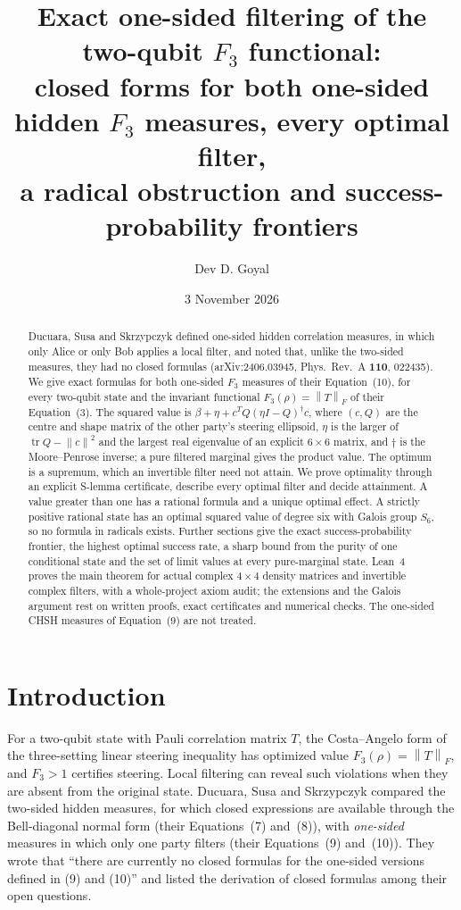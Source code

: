 \documentclass[11pt]{article}
\title{Exact one-sided filtering of the two-qubit $F_3$ functional:\\
\large closed forms for both one-sided hidden $F_3$ measures, every optimal filter,\\
a radical obstruction and success-probability frontiers}
\author{Dev D. Goyal}
\date{3 November 2026}
\theoremstyle{remark}\newtheorem{remark}[theorem]{Remark}
\newcommand{\tr}{\operatorname{tr}}
\newcommand{\norm}[1]{\left\lVert#1\right\rVert}
\begin{document}
\maketitle
\begin{abstract}
Ducuara, Susa and Skrzypczyk defined one-sided hidden correlation measures,
in which only Alice or only Bob applies a local filter, and noted that, unlike
the two-sided measures, they had no closed formulas
(arXiv:2406.03945, Phys.\ Rev.\ A \textbf{110}, 022435). We give exact
formulas for both one-sided $F_3$ measures of their Equation~(10), for every
two-qubit state and the invariant functional $F_3(\rho)=\norm{T}_F$ of their
Equation~(3). The squared value is $\beta+\eta+c^TQ(\eta I-Q)^\dagger c$,
where $(c,Q)$ are the centre and shape matrix of the other party's steering
ellipsoid, $\eta$ is the larger of $\tr Q-\norm c^2$ and the largest real
eigenvalue of an explicit $6\times6$ matrix, and $\dagger$ is the
Moore--Penrose inverse; a pure filtered marginal gives the product value.
The optimum is a supremum, which an invertible filter need not attain. We
prove optimality through an explicit S-lemma certificate, describe every
optimal filter and decide attainment. A value greater than one has a rational
formula and a unique optimal effect. A strictly positive rational state has
an optimal squared value of degree six with Galois group $S_6$, so no formula
in radicals exists. Further sections give the exact success-probability
frontier, the highest optimal success rate, a sharp bound from the purity of
one conditional state and the set of limit values at every pure-marginal
state. Lean~4 proves the main theorem for actual complex $4\times4$ density
matrices and invertible complex filters, with a whole-project axiom audit;
the extensions and the Galois argument rest on written proofs, exact
certificates and numerical checks. The one-sided CHSH measures of
Equation~(9) are not treated.
\end{abstract}

\tableofcontents
\clearpage

\section{Introduction}

For a two-qubit state with Pauli correlation matrix $T$, the Costa--Angelo
form of the three-setting linear steering inequality \cite{costa,cjwr} has
optimized value $F_3(\rho)=\norm{T}_F$, and $F_3>1$ certifies steering.
Local filtering can reveal such violations when they are absent from the
original state. Ducuara, Susa and Skrzypczyk \cite{ducuara} compared the
two-sided hidden measures, for which closed expressions are available
through the Bell-diagonal normal form (their Equations~(7) and~(8)), with
\emph{one-sided} measures in which only one party filters
(their Equations~(9) and~(10)). They wrote that ``there are currently no
closed formulas for the one-sided versions defined in (9) and (10)'' and
listed the derivation of closed formulas among their open questions.
\end{document}
